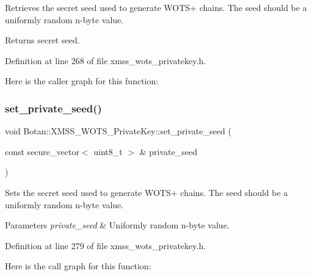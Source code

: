 Retrieves the secret seed used to generate W\+O\+T\+S+ chains. The seed should be a uniformly random n-\/byte value.

\begin{DoxyReturn}{Returns}
secret seed. 
\end{DoxyReturn}


Definition at line 268 of file xmss\+\_\+wots\+\_\+privatekey.\+h.

Here is the caller graph for this function\+:
\mbox{\label{class_botan_1_1_x_m_s_s___w_o_t_s___private_key_abd67c12003a5600b9aaed25b91a96fa5}} 
\subsubsection{\texorpdfstring{set\+\_\+private\+\_\+seed()}{set\_private\_seed()}\hspace{0.1cm}{\footnotesize\ttfamily [1/2]}}
{\footnotesize\ttfamily void Botan\+::\+X\+M\+S\+S\+\_\+\+W\+O\+T\+S\+\_\+\+Private\+Key\+::set\+\_\+private\+\_\+seed (\begin{DoxyParamCaption}\item[{const secure\+\_\+vector$<$ uint8\+\_\+t $>$ \&}]{private\+\_\+seed }\end{DoxyParamCaption})\hspace{0.3cm}{\ttfamily [inline]}}

Sets the secret seed used to generate W\+O\+T\+S+ chains. The seed should be a uniformly random n-\/byte value.


\begin{DoxyParams}{Parameters}
{\em private\+\_\+seed} & Uniformly random n-\/byte value. \\
\hline
\end{DoxyParams}


Definition at line 279 of file xmss\+\_\+wots\+\_\+privatekey.\+h.

Here is the call graph for this function\+:
\mbox{\label{class_botan_1_1_x_m_s_s___w_o_t_s___private_key_a497d20e641d7234d56657e52d307026b}} 

